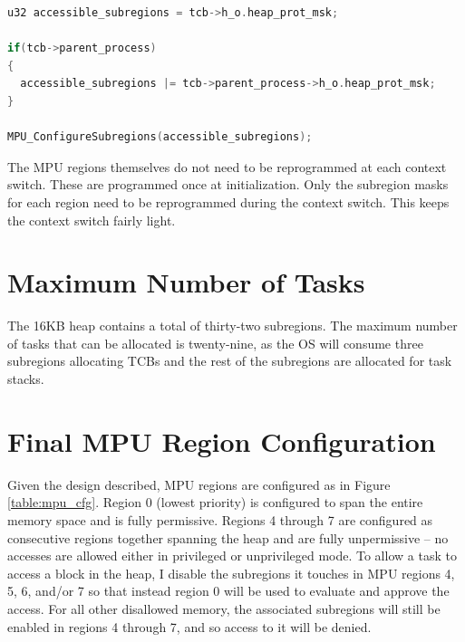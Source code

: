 \begin{lstlisting}[language=c, caption={Pseudo-code demonstrating how subregions are made accessible based on the TCB \textit{and} PCB.}, captionpos=b, label={lst:subregions}, float]
u32 accessible_subregions = tcb->h_o.heap_prot_msk;

if(tcb->parent_process)
{
  accessible_subregions |= tcb->parent_process->h_o.heap_prot_msk;
}

MPU_ConfigureSubregions(accessible_subregions);

\end{lstlisting}

The MPU regions themselves do not need to be reprogrammed at each context switch. These are programmed once at initialization. Only the subregion masks for each region need to be reprogrammed during the context switch. This keeps the context switch fairly light.

\section{Maximum Number of Tasks}

The 16KB heap contains a total of thirty-two subregions. The maximum number of tasks that can be allocated is twenty-nine, as the OS will consume three subregions allocating TCBs and the rest of the subregions are allocated for task stacks.

\section{Final MPU Region Configuration}

Given the design described, MPU regions are configured as in Figure \ref{table:mpu_cfg}. Region 0 (lowest priority) is configured to span the entire memory space and is fully permissive. Regions 4 through 7 are configured as consecutive regions together spanning the heap and are fully unpermissive -- no accesses are allowed either in privileged or unprivileged mode. To allow a task to access a block in the heap, I disable the subregions it touches in MPU regions 4, 5, 6, and/or 7 so that instead region 0 will be used to evaluate and approve the access. For all other disallowed memory, the associated subregions will still be enabled in regions 4 through 7, and so access to it will be denied.



